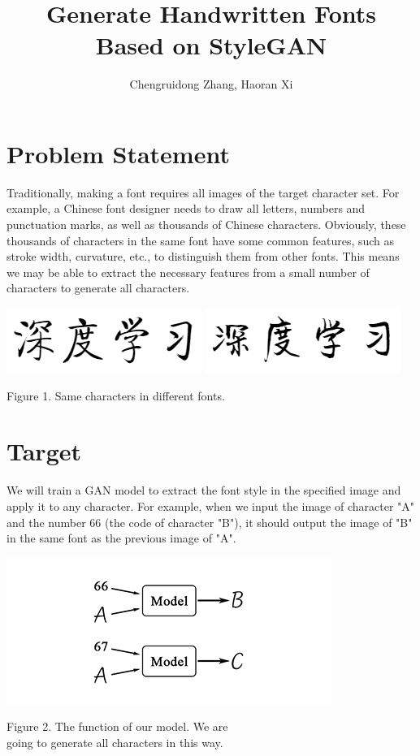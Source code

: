 \documentclass[letterpaper]{article}
\begin{document}
%
\title{Generate Handwritten Fonts \\ Based on StyleGAN}
\author{Chengruidong Zhang, Haoran Xi}
\maketitle

\section{Problem Statement}
Traditionally, making a font requires all images of the target character set. For example, a Chinese font designer needs to draw all letters, numbers and punctuation marks, as well as thousands of Chinese characters.
Obviously, these thousands of characters in the same font have some common features, such as stroke width, curvature, etc., to distinguish them from other fonts. This means we may be able to extract the necessary features from a small number of characters to generate all characters.
\begin{center}
    \includegraphics[]{proposal-fig-qiti.png}
    \includegraphics[]{proposal-fig-jinglei.png}

    Figure 1. Same characters in different fonts. 
\end{center}


\section{Target}
We will train a GAN model to extract the font style in the specified image and apply it to any character. For example, when we input the image of character "A" and the number 66 (the code of character "B"), it should output the image of "B" in the same font as the previous image of "A".
\begin{center}
    \includegraphics[]{proposal-fig-model.png}

    Figure 2. The function of our model. We are\\ going to generate all characters in this way.
\end{center}
\end{document}

